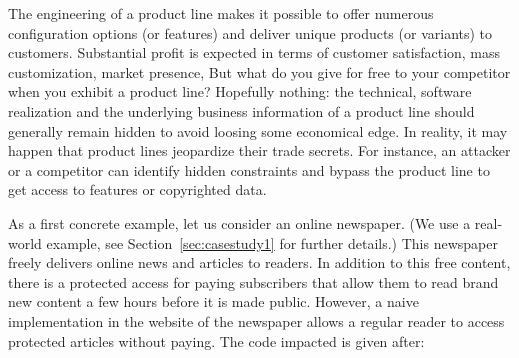 %



The engineering of a product line makes it possible to offer numerous configuration options (or features) and deliver unique products (or variants) to customers. Substantial profit is expected in terms of customer satisfaction, mass customization, market presence, \etc 
%
 But what do you give for free to your competitor when you exhibit a product line? 
Hopefully nothing: the technical, software realization and the underlying business information of a product line should generally remain hidden to avoid loosing some economical edge.
 In reality, it may happen that product lines jeopardize their trade secrets. 
 For instance, an attacker or a competitor can identify hidden constraints and bypass the product line to get access to features or copyrighted data.

 
 
 As a first concrete example, let us consider an online newspaper. (We use a real-world example, see Section~\ref{sec:casestudy1} for further details.) This newspaper freely delivers online news and articles to readers. In addition to this free content, there is a protected access for paying subscribers that allow them to read brand new content a few hours before it is made public. However, 
 a naive implementation in the website of the newspaper allows a regular reader to access protected articles without paying. 
 The code impacted is given after: 
 


